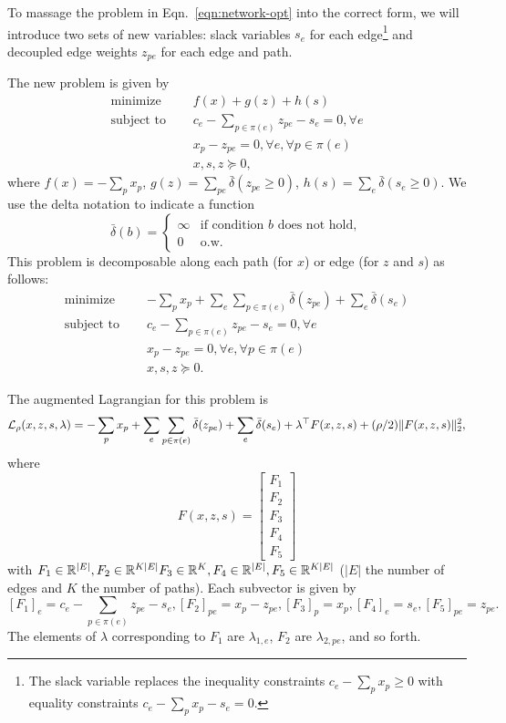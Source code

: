 \documentclass[11pt]{article}
\begin{document}
To massage the problem in Eqn.~\ref{eqn:network-opt} into the correct form,
we will introduce two sets of new variables: slack variables $s_e$ for each edge\footnote{
The slack variable replaces the inequality constraints $c_e - \sum_p x_p \ge 0$
with equality constraints $c_e - \sum_p x_p - s_e = 0$.
}
and decoupled edge weights $z_{pe}$ for each edge and path.

The new problem is given by
\begin{equation}
\label{eqn:network-opt-std}
\begin{aligned}
\textrm{minimize } \quad & f(x) + g(z) + h(s)\\
\textrm{subject to } \quad &c_e - \sum_{p\in\pi(e)}z_{pe} - s_{e} = 0, \forall e\\
&x_p - z_{pe} = 0, \forall e, \forall p \in \pi(e)\\
&x,s,z \succeq 0,
\end{aligned}
\end{equation}
where $f(x) = -\sum_p x_p$,
$g(z) = \sum_{pe} \bar\delta(z_{pe} \ge 0)$, $h(s) = \sum_{e} \bar\delta(s_{e} \ge 0)$.
We use the delta notation to indicate a function
$$
\bar\delta(b) = \begin{cases}
    \infty & \textrm{if condition } b \textrm{ does not hold},\\
    0 & \textrm{o.w.}
\end{cases}
$$
This problem is decomposable along each path (for $x$) or edge (for $z$ and $s$) as follows:
\begin{equation}
\label{eqn:network-opt-sep}
\begin{aligned}
\textrm{minimize } \quad & -\sum_p x_p
    + \sum_e\sum_{p \in \pi(e)} \bar\delta(z_{pe})
    + \sum_e \bar\delta(s_{e})\\
\textrm{subject to } \quad &c_e - \sum_{p\in\pi(e)}z_{pe} - s_{e} = 0, \forall e\\
&x_p - z_{pe} = 0, \forall e, \forall p \in \pi(e)\\
&x,s,z \succeq 0.
\end{aligned}
\end{equation}

The augmented Lagrangian for this problem is
\begin{equation}
    \label{eqn:network-lagrangian}
    \mathcal{L}_\rho(x,z,s,\lambda) =-\sum_p x_p + \sum_e\sum_{p\in\pi(e)} \bar\delta(z_{pe})
        + \sum_{e} \bar\delta(s_{e})
        + \lambda^\top F(x,z,s)
        + (\rho/2)\| F(x,z,s) \|_2^2,
\end{equation}
where
$$F(x,z,s) =
\begin{bmatrix}
F_1 \\
F_2 \\
F_3 \\
F_4 \\
F_5
\end{bmatrix}
$$
with $F_1 \in \mathbb{R}^{|E|}, F_2\in\mathbb{R}^{K|E|}F_3\in\mathbb{R}^{K},F_4\in\mathbb{R}^{|E|},F_5\in\mathbb{R}^{K|E|}$
($|E|$ the number of edges and $K$ the number of paths).
Each subvector is given by
$$
    [F_1]_e = c_e - \sum_{p\in\pi(e)}z_{pe} - s_{e},
    [F_2]_{pe} = x_p - z_{pe},
    [F_3]_p = x_p,
    [F_4]_{e} = s_{e},
    [F_5]_{pe} = z_{pe}.
$$
The elements of $\lambda$ corresponding to $F_1$ are $\lambda_{1,e}$,
$F_2$ are $\lambda_{2,pe}$, and so forth.
\end{document}
